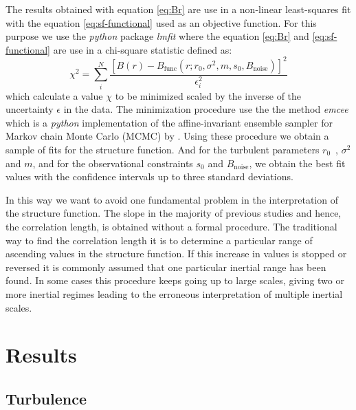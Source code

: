 \documentclass[fleqn,usenatbib, useAMS, a4paper]{mnras}
\begin{document}
The results obtained with equation \ref{eq:Br} are use in a non-linear least-squares fit with the equation \ref{eq:sf-functional} used as an objective function.
For this purpose we use the \textit{python} package \textit{lmfit} \citep{newville_matthew_2014_11813} where the equation \ref{eq:Br} and \ref{eq:sf-functional} are use in a chi-square statistic defined as:
%
%
%
\begin{equation}\label{eq:chi}
  \chi^2 = \sum_i ^N \frac{[B(r)-B_{\text{func}}(r;r_0, \sigma^2, m, s_0, B_{\text{noise}})]^2}{\epsilon_i ^2}
\end{equation}
%
which calculate a value \(\chi\) to be minimized scaled by the inverse of the uncertainty \(\epsilon\) in the data.
The minimization procedure use the the method \textit{emcee} \citep{2013PASP..125..306F} which is a \textit{python} implementation of the affine-invariant ensemble sampler for Markov chain Monte Carlo (MCMC) by \citet{2010CAMCS...5...65G}.  
Using these procedure we obtain a sample of fits for the structure function.
And for the turbulent parameters \(r_{0}\)\ , \(\sigma^2\) and \(m\), and for the observational constraints \(s_0\) and \( B_{\text{noise}}\), we obtain the best fit values with the confidence intervals up to three standard deviations.

In this way we want to avoid one fundamental problem in the interpretation of the structure function. 
The slope in the majority of previous studies and hence, the correlation length, is obtained without a formal procedure. 
The traditional way to find the correlation length it is to determine a particular range of ascending values in the structure function. 
If this increase in values is stopped or reversed it is commonly assumed that one particular inertial range has been found. 
In some cases this procedure keeps going up to large scales, giving two or more inertial regimes leading to the erroneous interpretation of multiple inertial scales.

\section{Results}\label{sec:results}

\subsection{Turbulence}
\end{document}
